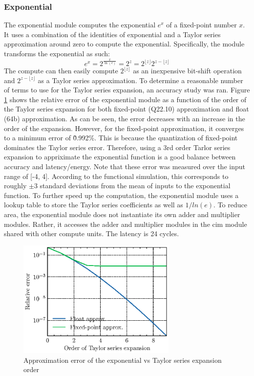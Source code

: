 \documentclass[12pt, hidelinks]{article}
\begin{document}
\subsubsection{Exponential}
The exponential module computes the exponential $e^{x}$ of a fixed-point number $x$. It uses a combination of the identities of exponential and a Taylor series approximation around zero to compute the exponential.
Specifically, the module transforms the exponential as such:
\begin{equation}
    e^{x} = 2^{\frac{x}{\ln(e)}} = 2^{z} = 2^{\lfloor{z}\rfloor}2^{z-\lfloor{z}\rfloor}
    \label{eq:exp_transform}
\end{equation}
The compute can then easily compute $2^{\lfloor{z}\rfloor}$ as an inexpensive bit-shift operation and $2^{z-\lfloor{z}\rfloor}$ as a Taylor series approximation. To determine a reasonable 
number of terms to use for the Taylor series expansion, an accuracy study was ran. Figure \ref{fig:exp_error} shows the relative error of the exponential module as a function of the order
of the Taylor series expansion for both fixed-point (Q22.10) approximation and float (64b) approximation. As can be seen, the error decreases with an increase in the order of the expansion.
However, for the fixed-point approximation, it converges to a minimum error of \~0.992\%. This is because the quantization of fixed-point dominates the Taylor series error. Therefore,
using a 3rd order Tarlor series expansion to appriximate the exponential function is a good balance between accuracy and latency/energy. Note that these error was measured over the input
range of [-4, 4]. According to the functional simulation, this corresponds to roughly $\pm3$ standard deviations from the mean of inputs to the exponential function. To further speed up the
computation, the exponential module uses a lookup table to store the Taylor series coefficients as well as $1/ln(e)$. To reduce area, the exponential module does not instantiate its own adder and
multiplier modules. Rather, it accesses the adder and multiplier modules in the \ac{cim} module shared with other compute units. The latency is 24 cycles.

\begin{figure}
    \centering
    \includegraphics[width=0.7\textwidth]{assets/exp_approx_error/exp_approx_error.eps}
    \caption{Approximation error of the exponential vs Taylor series expansion order}
    \label{fig:exp_error}
\end{figure}
\end{document}
